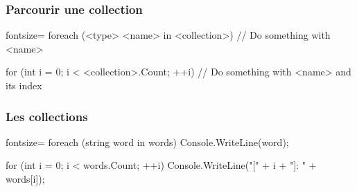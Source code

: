 \begin{frame}[fragile]
  \frametitle{Parcourir une collection}

  \begin{csharpcode*}{fontsize=\scriptsize}
    foreach (<type> <name> in <collection>)
    {
      // Do something with <name>
    }

    for (int i = 0; i < <collection>.Count; ++i)
    {
      // Do something with <name> and its index
    }
  \end{csharpcode*}
\end{frame}

\begin{frame}[fragile]
  \frametitle{Les collections}

  \begin{csharpcode*}{fontsize=\scriptsize}
    foreach (string word in words)
    {
      Console.WriteLine(word);
    }

    for (int i = 0; i < words.Count; ++i)
    {
      Console.WriteLine("[" + i + "]: " + words[i]);
    }
  \end{csharpcode*}
\end{frame}


